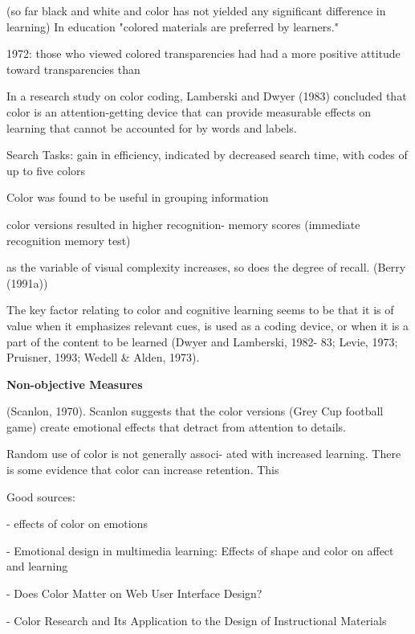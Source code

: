 		(so far black and white and color has not yielded any significant difference in learning)
		In education "colored materials are preferred by learners." \cite[p.25]{Pert1996}
		
		1972: those who viewed colored transparencies had had a more positive attitude toward transparencies than \cite{Pert1996}
		
		In a research study on color coding, Lamberski and Dwyer (1983) concluded that color is an attention-getting device that can provide measurable effects on learning that cannot be accounted for by words and labels. \cite{Pert1996}
		
		Search Tasks: 
		gain in efficiency, indicated by decreased search time, with codes of up to five colors \cite{Pert1996}
		
		Color was found to be useful in grouping information
		
		color versions resulted in higher recognition- memory scores (immediate recognition memory test)\cite{Pert1996}
		
		as the variable of visual complexity increases, so does the degree of recall. (Berry (1991a)) \cite{Pert1996}
		
		The key factor relating to color and cognitive learning seems to be that it is of value when it emphasizes relevant cues, is used as a coding device, or when it is a part of the content to be learned (Dwyer and Lamberski, 1982- 83; Levie, 1973; Pruisner, 1993; Wedell \& Alden, 1973). \cite{Pert1996}
		
		\textbf{Non-objective Measures}
		
		(Scanlon, 1970). Scanlon suggests that the color versions (Grey Cup football game) create emotional effects that detract from attention to details.
		
		
		Random use of color is not generally associ- ated with increased learning. There is some evidence that color can increase retention. This \cite{Pert1996}

		
		Good sources:
		
		\cite{Valdez1994} - effects of color on emotions
		
		\cite{Plass2014} - Emotional design in multimedia learning: Effects of shape and color on affect and learning
		
		\cite{Swasty2017} - Does Color Matter on Web User Interface Design?
		
		\cite{Pert1996} - Color Research and Its Application to the Design of Instructional Materials
		

